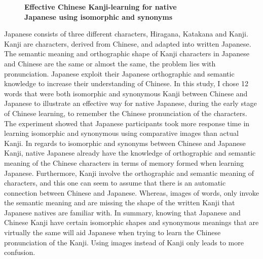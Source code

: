 \documentclass[10pt, a4paper, twopage, headinclude, footinclude, BCOR5mm]{scrartcl}
\begin{document}
\newpage

\begin{figure}[t!]
\centering
\large\textbf{Effective Chinese Kanji-learning for native \\ Japanese using isomorphic and synonyms}
\vspace*{0.5cm}
\end{figure}


        \begin{table}[t!]
    \end{table}

\noindent
Japanese consists of three different characters, Hiragana, Katakana and Kanji. Kanji are characters, derived from Chinese, and adapted into written Japanese. The semantic meaning and orthographic shape of Kanji characters in Japanese and Chinese are the same or almost the same, the problem lies with pronunciation. Japanese exploit their Japanese orthographic and semantic knowledge to increase their understanding of Chinese. In this study, I chose 12 words that were both isomorphic and synonymous Kanji between Chinese and Japanese to illustrate an effective way for native Japanese, during the early stage of Chinese learning, to remember the Chinese pronunciation of the characters. The experiment showed that Japanese participants took more response time in learning isomorphic and synonymous using comparative images than actual Kanji. In regards to isomorphic and synonyms between Chinese and Japanese Kanji, native Japanese already have the knowledge of orthographic and semantic meaning of the Chinese characters in terms of memory formed when learning Japanese. Furthermore, Kanji involve the orthographic and semantic meaning of characters, and this one can seem to assume that there is an automatic connection between Chinese and Japanese. Whereas, images of words, only invoke the semantic meaning and are missing the shape of the written Kanji that Japanese natives are familiar with. In summary, knowing that Japanese and Chinese Kanji have certain isomorphic shapes and synonymous meanings that are virtually the same will aid Japanese when trying to learn the Chinese pronunciation of the Kanji. Using images instead of Kanji only leads to more confusion.
\end{document}
